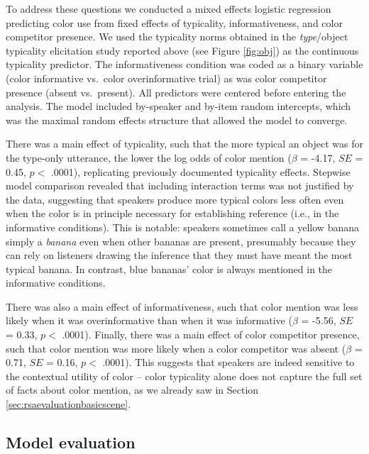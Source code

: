 \documentclass[11pt]{article}
\newcommand{\figref}[1]{Figure \ref{#1}}
\newcommand{\sectionref}[1]{Section \ref{#1}}
\begin{document}
To address these questions we conducted a mixed effects logistic regression predicting color use from fixed effects of typicality, informativeness, and color competitor presence. We used the typicality norms obtained in the \emph{type}/object typicality elicitation study reported above (see \figref{fig:obj}) as the continuous typicality predictor. The informativeness condition was coded as a binary variable (color informative vs.~color overinformative trial) as was color competitor presence (absent vs.~present). All predictors were centered before entering the analysis. The model included by-speaker and by-item random intercepts, which was the maximal random effects structure that allowed the model to converge.

There was a main effect of typicality, such that the more typical an object was for the type-only utterance, the lower the log odds of color mention ($\beta$ = -4.17, $SE$ = 0.45, $p <$ .0001), replicating previously documented typicality effects. Stepwise model comparison revealed that including interaction terms was not justified by the data, suggesting that speakers produce more typical colors less often even when the color is in principle necessary for establishing reference (i.e., in the informative conditions). This is notable: speakers sometimes call a yellow banana simply a \emph{banana} even when other bananas are present, presumably because they can rely on listeners drawing the inference that they must have meant the most typical banana. In contrast, blue bananas' color is always mentioned in the informative conditions.

There was also a main effect of informativeness, such that color mention was less likely when it was overinformative than when it was informative ($\beta$ = -5.56, $SE$ = 0.33, $p <$ .0001). Finally, there was a main effect of color competitor presence, such that color mention was more likely when a color competitor was absent  ($\beta$ = 0.71, $SE$ = 0.16, $p <$ .0001). This suggests that speakers are indeed sensitive to the contextual utility of color -- color typicality alone does not capture the full set of facts about color mention, as we already saw in \sectionref{sec:rsaevaluationbasicscene}.


\subsection{Model evaluation}
\label{sec:colorypicalitymodel}
\end{document}
